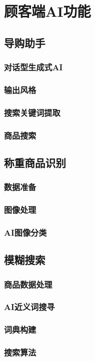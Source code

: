 \newpage
\section{顾客端AI功能}
\label{sec:guest_features}

\subsection{导购助手}

\subsubsection{对话型生成式AI}

\subsubsection{输出风格}

\subsubsection{搜索关键词提取}

\subsubsection{商品搜索}

\subsection{称重商品识别}

\subsubsection{数据准备}

\subsubsection{图像处理}

\subsubsection{AI图像分类}

\subsection{模糊搜索}

\subsubsection{商品数据处理}

\subsubsection{AI近义词搜寻}

\subsubsection{词典构建}

\subsubsection{搜索算法}